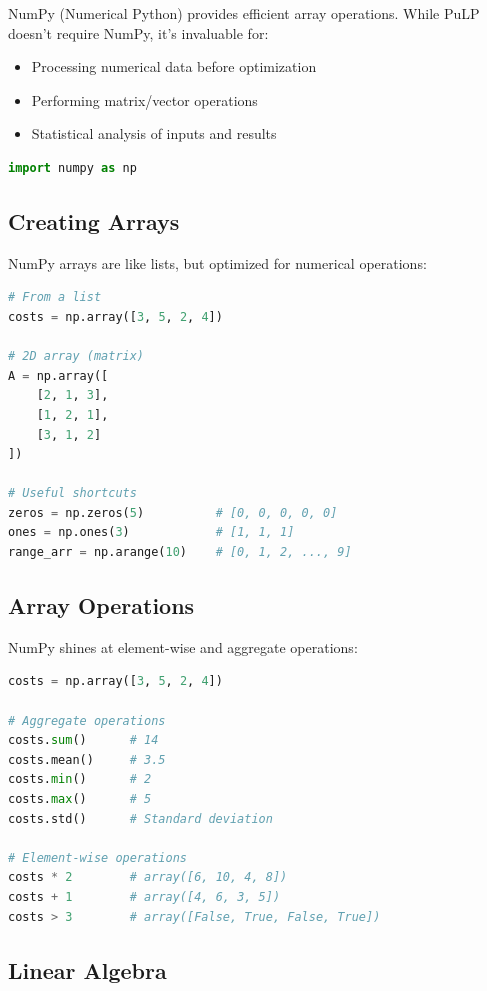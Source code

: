 NumPy (Numerical Python) provides efficient array operations. While PuLP doesn't require NumPy, it's invaluable for:
\begin{itemize}
\item Processing numerical data before optimization
\item Performing matrix/vector operations
\item Statistical analysis of inputs and results
\end{itemize}

\begin{lstlisting}[language=Python]
import numpy as np
\end{lstlisting}

\subsection{Creating Arrays}

NumPy arrays are like lists, but optimized for numerical operations:

\begin{lstlisting}[language=Python]
# From a list
costs = np.array([3, 5, 2, 4])

# 2D array (matrix)
A = np.array([
    [2, 1, 3],
    [1, 2, 1],
    [3, 1, 2]
])

# Useful shortcuts
zeros = np.zeros(5)          # [0, 0, 0, 0, 0]
ones = np.ones(3)            # [1, 1, 1]
range_arr = np.arange(10)    # [0, 1, 2, ..., 9]
\end{lstlisting}

\subsection{Array Operations}

NumPy shines at element-wise and aggregate operations:

\begin{lstlisting}[language=Python]
costs = np.array([3, 5, 2, 4])

# Aggregate operations
costs.sum()      # 14
costs.mean()     # 3.5
costs.min()      # 2
costs.max()      # 5
costs.std()      # Standard deviation

# Element-wise operations
costs * 2        # array([6, 10, 4, 8])
costs + 1        # array([4, 6, 3, 5])
costs > 3        # array([False, True, False, True])
\end{lstlisting}

\subsection{Linear Algebra}

